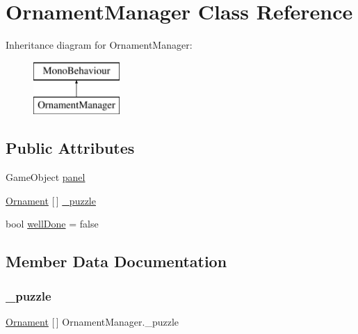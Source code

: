 \hypertarget{class_ornament_manager}{}\section{Ornament\+Manager Class Reference}
\label{class_ornament_manager}
Inheritance diagram for Ornament\+Manager\+:\begin{figure}[H]
\begin{center}
\leavevmode
\includegraphics[height=2.000000cm]{class_ornament_manager}
\end{center}
\end{figure}
\subsection*{Public Attributes}
\begin{DoxyCompactItemize}
\item 
Game\+Object \mbox{\hyperlink{class_ornament_manager_a774b255d77938f0e0172b62a334f3c90}{panel}}
\item 
\mbox{\hyperlink{class_ornament}{Ornament}} \mbox{[}$\,$\mbox{]} \mbox{\hyperlink{class_ornament_manager_ab4161a70592b59370a110f6e0b47b84f}{\+\_\+puzzle}}
\item 
bool \mbox{\hyperlink{class_ornament_manager_a5e8539e721f6c95e3f6d080851dc1219}{well\+Done}} = false
\end{DoxyCompactItemize}


\subsection{Member Data Documentation}
\mbox{\label{class_ornament_manager_ab4161a70592b59370a110f6e0b47b84f}} 
\subsubsection{\texorpdfstring{\+\_\+puzzle}{\_puzzle}}
{\footnotesize\ttfamily \mbox{\hyperlink{class_ornament}{Ornament}} \mbox{[}$\,$\mbox{]} Ornament\+Manager.\+\_\+puzzle}

